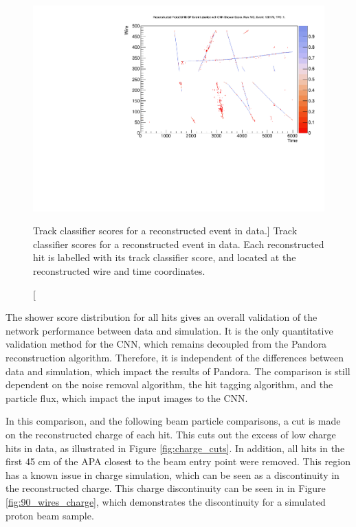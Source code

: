 \begin{figure}
	\centering
	\includegraphics[width=\textwidth]{figures/5387_image_tpc1_view2_128178.pdf}
	\caption
	[Track classifier scores for a reconstructed event in \protodune{} data.]
	{Track classifier scores for a reconstructed event in \protodune{} data. Each
	reconstructed hit is labelled with its track classifier score, and located at
	the reconstructed wire and time coordinates.}
	\label{fig:real_event}
\end{figure}

The shower score distribution for all hits gives an overall validation of the 
network performance between data and simulation. It is the only quantitative 
validation method for the CNN, which remains decoupled from the Pandora 
reconstruction algorithm. Therefore, it is independent of the differences 
between data and simulation, which impact the results of Pandora.  The 
comparison is still dependent on the noise removal algorithm, the hit tagging 
algorithm, and the particle flux, which impact the input images to the CNN.

In this comparison, and the following beam particle comparisons, a cut is made 
on the reconstructed charge of each hit. This cuts out the excess of low 
charge hits in data, as illustrated in Figure \ref{fig:charge_cuts}.  In 
addition, all hits in the first 45 cm of the APA closest to the beam entry 
point were removed. This region has a known issue in charge simulation, which 
can be seen as a discontinuity in the reconstructed charge. This charge 
discontinuity can be seen in in Figure \ref{fig:90_wires_charge}, which 
demonstrates the discontinuity for a simulated proton beam sample.  

